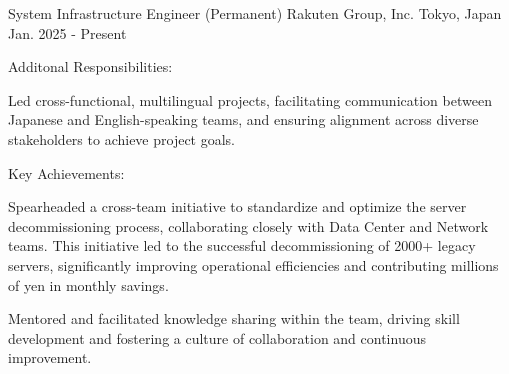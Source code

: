 

\begin{cventries}

  \cventry
    {System Infrastructure Engineer (Permanent)} %
    {Rakuten Group, Inc.} %
    {Tokyo, Japan} %
    {Jan. 2025 - Present} %
    {
      Additonal Responsibilities:
      \begin{cvbullets}
        \item Led cross-functional, multilingual projects,
        facilitating communication between Japanese and English-speaking teams,
        and ensuring alignment across diverse stakeholders to achieve project goals.
      \end{cvbullets}
      Key Achievements:
      \begin{cvbullets}
        \item Spearheaded a cross-team initiative to standardize and optimize the server decommissioning process,
        collaborating closely with Data Center and Network teams.
        This initiative led to the successful decommissioning of 2000+ legacy servers,
        significantly improving operational efficiencies and contributing millions of yen in monthly savings.
        \item Mentored and facilitated knowledge sharing within the team,
        driving skill development and fostering a culture of collaboration and continuous improvement.
      \end{cvbullets}
    }
  

\end{cventries}
